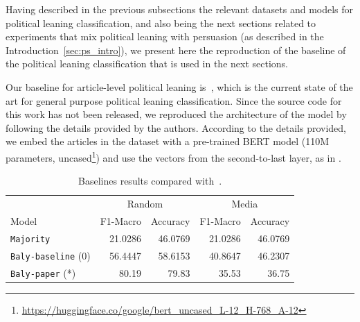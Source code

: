 


Having described in the previous subsections the relevant datasets and models for political leaning classification, and also being the next sections related to experiments that mix political leaning with persuasion (as described in the Introduction~\ref{sec:ps_intro}),
we present here the reproduction of the baseline of the political leaning classification that is used in the next sections.

Our baseline for article-level political leaning is~\citet{baly2020we}, which is the current state of the art for general purpose political leaning classification.
Since the source code for this work has not been released, we reproduced the architecture of the model by following the details provided by the authors. %
According to the details provided, we embed the articles in the dataset with a pre-trained BERT model (110M parameters, uncased\footnote{\url{https://huggingface.co/google/bert_uncased_L-12_H-768_A-12}}) and use the vectors from the second-to-last layer, as in \citet{baly2020we}. %

\begin{table}[!htbp]
    \centering
   \scriptsize
    \begin{tabular}{l|rr|rr}
        & \multicolumn{2}{c}{Random} & \multicolumn{2}{c}{Media} \\
        Model & F1-Macro & Accuracy & F1-Macro & Accuracy \\
        \hline
        \texttt{Majority} & 21.0286 & 46.0769 & 21.0286 & 46.0769 \\
        \texttt{Baly-baseline} (0) & 56.4447 & 58.6153 & 40.8647 & 46.2307 \\
        \texttt{Baly-paper} (*) & 80.19 & 79.83 & 35.53 & 36.75 \\
    \end{tabular}
    \caption{Baselines results compared with~\citet{baly2020we}.}
    \label{tab:results_baselines_classifier}
\end{table}

